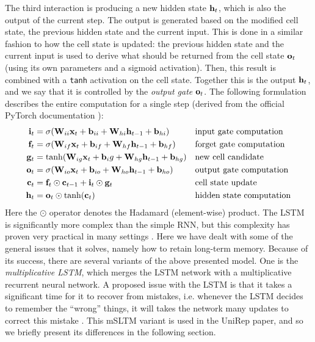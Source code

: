 \documentclass[a4paper,12pt]{article}
\begin{document}
The third interaction is producing a new hidden state $\mathbf{ h }_t$, which is also the output of the current step. The output is generated based on the modified cell state, the previous hidden state and the current input. This is done in a similar fashion to how the cell state is updated: the previous hidden state and the current input is used to derive what should be returned from the cell state $\mathbf{ o }_t$ (using its own parameters and a sigmoid activation). Then, this result is combined with a \texttt{tanh} activation on the cell state. Together this is the output $\mathbf{ h }_t$, and we say that it is controlled by the \textit{output gate} $\mathbf{ o }_t$. The following formulation describes the entire computation for a single step (derived from the official PyTorch documentation \cite{pytorch_lstm_doc}):
\begin{align*}
    \mathbf{ i }_t &= \sigma{\mathopen{} \left( \mathbf{ W }_{ii}\mathbf{ x }_t + \mathbf{ b }_{ii} + \mathbf{ W }_{hi}\mathbf{ h }_{t-1} + \mathbf{ b }_{hi} \right) \mathclose{}}&&\text{input gate computation}\\
    \mathbf{ f }_t &= \sigma {\mathopen{} \left( \mathbf{ W }_{if} \mathbf{ x }_t + \mathbf{ b }_{if} + \mathbf{ W }_{hf}\mathbf{ h }_{t-1} + \mathbf{ b }_{hf} \right) \mathclose{}} &&\text{forget gate computation}\\
    \mathbf{ g }_t &= \operatorname{tanh}\!{\mathopen{} \left( \mathbf{ W }_{ig} \mathbf{ x }_t + \mathbf{ b }_ig + \mathbf{ W }_{hg} \mathbf{ h }_{t - 1} + \mathbf{ b }_{hg} \right) \mathclose{}}&&\text{new cell candidate}\\
    \mathbf{ o }_t &= \sigma{\mathopen{} \left( \mathbf{ W }_{io} \mathbf{ x }_t + \mathbf{ b }_{io} + \mathbf{ W }_{ho}\mathbf{ h }_{t-1} + \mathbf{ b }_{ho} \right) \mathclose{}}&&\text{output gate computation}\\
    \mathbf{ c }_t &= \mathbf{ f }_t \odot \mathbf{ c }_{t-1} + \mathbf{ i }_t \odot \mathbf{ g }_t&&\text{cell state update}\\
    \mathbf{ h }_t &= \mathbf{ o }_t \odot \operatorname{tanh}\!{\mathopen{} \left( \mathbf{ c }_t \right) \mathclose{}}&&\text{hidden state computation}
\end{align*}
Here the $\odot$ operator denotes the Hadamard (element-wise) product. The LSTM is significantly more complex than the simple RNN, but this complexity has proven very practical in many settings \cite{chung2014empirical}. Here we have dealt with some of the general issues that it solves, namely how to retain long-term memory. Because of its success, there are several variants of the above presented model. One is the \textit{multiplicative LSTM}, which merges the LSTM network with a multiplicative recurrent neural network. A proposed issue with the LSTM is that it takes a significant time for it to recover from mistakes, i.e. whenever the LSTM decides to remember the ``wrong'' things, it will takes the network many updates to correct this mistake \cite{krause2016multiplicative}. 
This mSLTM variant is used in the UniRep paper, and so we briefly present its differences in the following section. 
\end{document}
